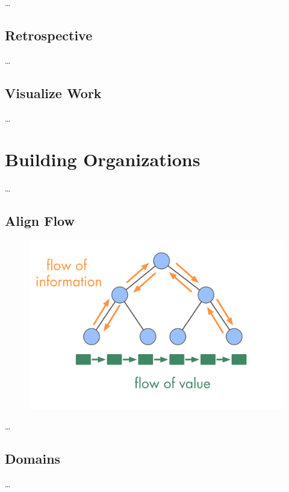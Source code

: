 {\ldots}

\section{Retrospective}
\label{retrospective}

{\ldots}

\section{Visualize Work}
\label{visualizework}

{\ldots}

\chapter{Building Organizations}
\label{buildingorganizations}

{\ldots}

\section{Align Flow}
\label{alignflow}

\begin{figure}[htbp]
\centering
\includegraphics[keepaspectratio,width=\textwidth,height=0.75\textheight]{img/evolution/types-of-flow.png}
\end{figure}

{\ldots}

\section{Domains}
\label{domains}

{\ldots}

